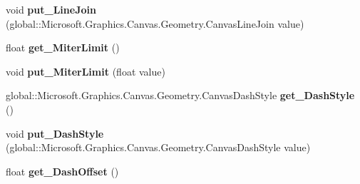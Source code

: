 \begin{DoxyCompactItemize}
\item 
\mbox{\label{interface_microsoft_1_1_graphics_1_1_canvas_1_1_geometry_1_1_i_canvas_stroke_style_a9917a7ec85d18fa2508e01a5bea88eb8}} 
void {\bfseries put\+\_\+\+Line\+Join} (global\+::\+Microsoft.\+Graphics.\+Canvas.\+Geometry.\+Canvas\+Line\+Join value)
\item 
\mbox{\label{interface_microsoft_1_1_graphics_1_1_canvas_1_1_geometry_1_1_i_canvas_stroke_style_a75a67b6c8e374ada2860deffb62fd790}} 
float {\bfseries get\+\_\+\+Miter\+Limit} ()
\item 
\mbox{\label{interface_microsoft_1_1_graphics_1_1_canvas_1_1_geometry_1_1_i_canvas_stroke_style_a8cae4d32f3a346d5bc506c2e5c172343}} 
void {\bfseries put\+\_\+\+Miter\+Limit} (float value)
\item 
\mbox{\label{interface_microsoft_1_1_graphics_1_1_canvas_1_1_geometry_1_1_i_canvas_stroke_style_a4e200c8b211b9a0372f10cfc99f37f85}} 
global\+::\+Microsoft.\+Graphics.\+Canvas.\+Geometry.\+Canvas\+Dash\+Style {\bfseries get\+\_\+\+Dash\+Style} ()
\item 
\mbox{\label{interface_microsoft_1_1_graphics_1_1_canvas_1_1_geometry_1_1_i_canvas_stroke_style_a3a3866d0af05bea0d5111d39bad2f7aa}} 
void {\bfseries put\+\_\+\+Dash\+Style} (global\+::\+Microsoft.\+Graphics.\+Canvas.\+Geometry.\+Canvas\+Dash\+Style value)
\item 
\mbox{\label{interface_microsoft_1_1_graphics_1_1_canvas_1_1_geometry_1_1_i_canvas_stroke_style_a261cdb6c0132a1ce93c7ecd652c1956d}} 
float {\bfseries get\+\_\+\+Dash\+Offset} ()
\item 
\mbox{\label{interface_microsoft_1_1_graphics_1_1_canvas_1_1_geometry_1_1_i_canvas_stroke_style_a470c5f115b6bf096380d61e538a59cad}} 

\end{DoxyCompactItemize}

